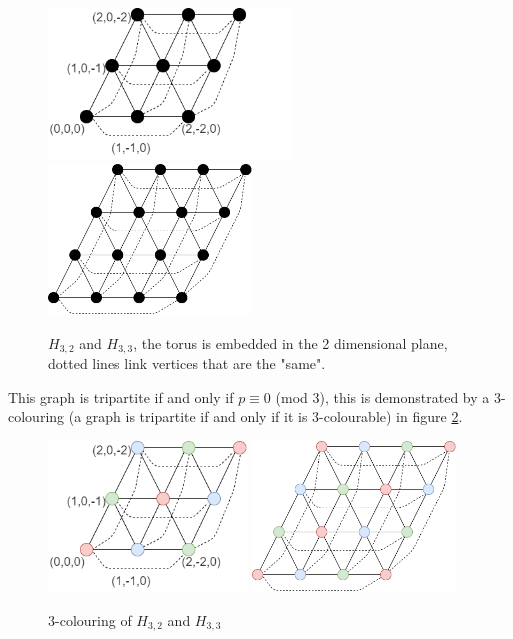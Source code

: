 \documentclass[a4paper,11pt]{report}
\newcounter{col}
\begin{document}
\begin{figure}[h!]
\begin{center}
		\includegraphics[height=40mm]{figures/holyer_coord.png}
		\includegraphics[height=40mm]{figures/holyer_3_4.png}
\end{center}
		\caption{$H_{3,2} $ and $H_{3,3}$, the torus is embedded in the 2 dimensional plane, dotted lines link vertices that are the "same".}
		\label{holyer}
\end{figure}

This graph is tripartite if and only if $p\equiv 0 $ (mod 3), this is demonstrated by a 3-colouring (a graph is tripartite if and only if it is 3-colourable) in figure \ref{holyercolour}.

\begin{figure}[h!]
\begin{center}
		\includegraphics[height=40mm]{figures/colour_holyer_coord.png}
		\includegraphics[height=40mm]{figures/colour_holyer.png}
\end{center}
		\caption{3-colouring of $H_{3,2} $ and $H_{3,3}$ }
		\label{holyercolour}
\end{figure}
\end{document}
